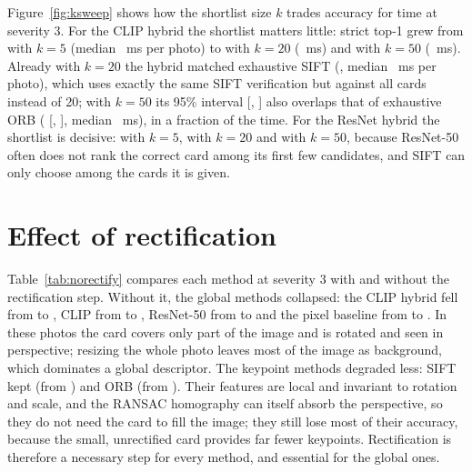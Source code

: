 Figure~\ref{fig:ksweep} shows how the shortlist size $k$ trades accuracy for time at severity 3. For the CLIP hybrid the shortlist matters little: strict top-1 grew from  with $k=5$ (median ~ms per photo) to  with $k=20$ (~ms) and  with $k=50$ (~ms). Already with $k=20$ the hybrid matched exhaustive SIFT (, median ~ms per photo), which uses exactly the same SIFT verification but against all  cards instead of 20; with $k=50$ its 95\% interval {\small[, ]} also overlaps that of exhaustive ORB ( {\small[, ]}, median ~ms), in a fraction of the time. For the ResNet hybrid the shortlist is decisive:  with $k=5$,  with $k=20$ and  with $k=50$, because ResNet-50 often does not rank the correct card among its first few candidates, and SIFT can only choose among the cards it is given.



\section{Effect of rectification}
\label{sec:res-norect}

Table~\ref{tab:norectify} compares each method at severity 3 with and without the rectification step. Without it, the global methods collapsed: the CLIP hybrid fell from  to , CLIP from  to , ResNet-50 from  to  and the pixel baseline from  to . In these photos the card covers only part of the image and is rotated and seen in perspective; resizing the whole photo leaves most of the image as background, which dominates a global descriptor. The keypoint methods degraded less: SIFT kept  (from ) and ORB  (from ). Their features are local and invariant to rotation and scale, and the RANSAC homography can itself absorb the perspective, so they do not need the card to fill the image; they still lose most of their accuracy, because the small, unrectified card provides far fewer keypoints. Rectification is therefore a necessary step for every method, and essential for the global ones.

